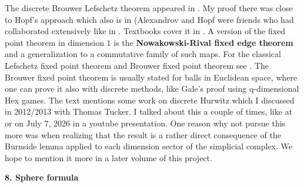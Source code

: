 \documentclass[12pt]{amsart}
\begin{document}
The discrete Brouwer Lefschetz theorem appeared in \cite{brouwergraph}.
My proof there was close to Hopf's approach \cite{Hopf28} which also is in
\cite{alexandroff} (Alexandrov and Hopf were friends who had collaborated extensively like in \cite{AlexandroffHopf}.
Textbooks cover it in \cite{JM,Spanier,GriffithsHarris,GD}. A version of the fixed point theorem 
in dimension $1$ is the
{\bf Nowakowski-Rival fixed edge theorem} \cite{NowakowskiRival} and a 
generalization \cite{Espinolaa} to a commutative family of such maps.
For the classical Lefschetz fixed point theorem and Brouwer fixed point
theorem see \cite{Lefschetz26a,BrownLefshetz}. The Brouwer fixed point
theorem is usually stated for balls in Euclidean space, where one can
prove it also with discrete methods, like Gale's proof using q-dimensional
Hex games. The text mentions some work on discrete Hurwitz \cite{TuckerKnill}
which I discussed in 2012/2013 with Thomas Tucker. I talked about this a couple of times, 
like at \cite{KnillBaltimore} or on July 7, 2026 in a youtube presentation. One reason
why not pursue this more was when realizing that the result is a rather direct
consequence of the Burnside lemma applied to each dimension sector of the 
simplicial complex. We hope to mention it more in a later volume of this project. \\

{\bf 8. Sphere formula} \\
\end{document}
